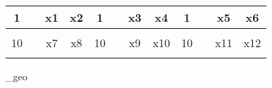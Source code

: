 \begin{center}
\begin{table}[]
\begin{tabular}{|c|c|c|c|c|c|c|c|c|c|c|c|}
 
   1  & \cellcolor[gray]{.8}   & x1   & x2 	  &  1 &  \cellcolor[gray]{.8}   & x3  & x4   &  1  &  \cellcolor[gray]{.8}   &  x5   & x6 \\ \hline 
      &&&&&&&&&&& \\ \hline

   10&  \cellcolor[gray]{.8}   & x7  & x8  &  10 & \cellcolor[gray]{.8}  &  x9   & x10  &  10 &  \cellcolor[gray]{.8}  &  x11  &  x12  \\ \hline 
      &&&&&&&&&&& \\ \hline
\end{tabular}
\end{table}
\end{center}

\Std_geo

